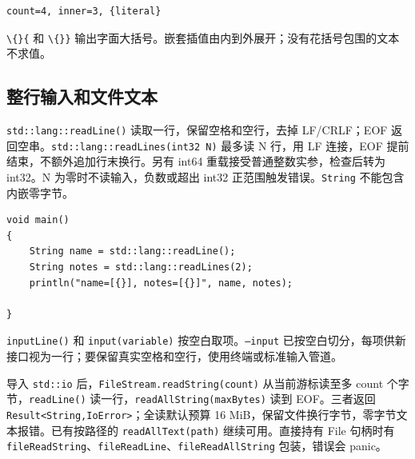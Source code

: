 \par
\medskip
\begin{lstlisting}[style=out]
count=4, inner=3, {literal}
\end{lstlisting}
\par
\medskip

\texttt{\textbackslash\{\}\{} 和 \texttt{\textbackslash\{\}\}} 输出字面大括号。嵌套插值由内到外展开；没有花括号包围的文本不求值。

\subsection*{整行输入和文件文本}

\texttt{std:\allowbreak{}:\allowbreak{}lang:\allowbreak{}:\allowbreak{}read\allowbreak{}Line(\allowbreak{})\allowbreak{}} 读取一行，保留空格和空行，去掉 LF/CRLF；EOF 返回空串。\texttt{std:\allowbreak{}:\allowbreak{}lang:\allowbreak{}:\allowbreak{}read\allowbreak{}Lines(\allowbreak{}int32 N)\allowbreak{}} 最多读 N 行，用 LF 连接，EOF 提前结束，不额外追加行末换行。另有 int64 重载接受普通整数实参，检查后转为 int32。N 为零时不读输入，负数或超出 int32 正范围触发错误。\texttt{String} 不能包含内嵌零字节。

\par
\medskip
\begin{lstlisting}[style=chali]
void main()
{
    String name = std::lang::readLine();
    String notes = std::lang::readLines(2);
    println("name=[{}], notes=[{}]", name, notes);

}
\end{lstlisting}
\par
\medskip

\texttt{input\allowbreak{}Line(\allowbreak{})\allowbreak{}} 和 \texttt{input(\allowbreak{}variable)\allowbreak{}} 按空白取项。\texttt{--input} 已按空白切分，每项供新接口视为一行；要保留真实空格和空行，使用终端或标准输入管道。

导入 \texttt{std:\allowbreak{}:\allowbreak{}io} 后，\texttt{File\allowbreak{}Stream.\allowbreak{}read\allowbreak{}String(\allowbreak{}count)\allowbreak{}} 从当前游标读至多 count 个字节，\texttt{read\allowbreak{}Line(\allowbreak{})\allowbreak{}} 读一行，\texttt{read\allowbreak{}All\allowbreak{}String(\allowbreak{}max\allowbreak{}Bytes)\allowbreak{}} 读到 EOF。三者返回 \texttt{Result<\allowbreak{}String,\allowbreak{}Io\allowbreak{}Error>\allowbreak{}}；全读默认预算 16 MiB，保留文件换行字节，零字节文本报错。已有按路径的 \texttt{read\allowbreak{}All\allowbreak{}Text(\allowbreak{}path)\allowbreak{}} 继续可用。直接持有 File 句柄时有 \texttt{file\allowbreak{}Read\allowbreak{}String}、\texttt{file\allowbreak{}Read\allowbreak{}Line}、\texttt{file\allowbreak{}Read\allowbreak{}All\allowbreak{}String} 包装，错误会 panic。


